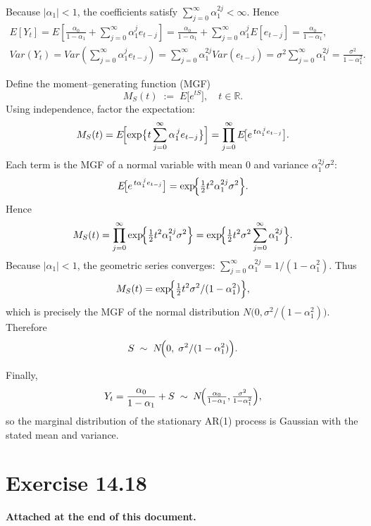 \documentclass{article}
\begin{document}
    Because \(|\alpha_1|<1\), the coefficients satisfy \(\sum_{j=0}^\infty \alpha_1^{2j}<\infty\). Hence
    \begin{align*}
        E[Y_t]
        =E\left[\frac{\alpha_0}{1-\alpha_1} + \sum_{j=0}^\infty \alpha_1^j e_{t-j}\right]
        =\frac{\alpha_0}{1-\alpha_1} + \sum_{j=0}^\infty \alpha_1^j E[e_{t-j}]
        =\frac{\alpha_0}{1-\alpha_1},\\
        Var(Y_t) = Var\left(\sum_{j=0}^\infty \alpha_1^j e_{t-j}\right)=\sum_{j=0}^\infty \alpha_1^{2j} Var(e_{t-j})=\sigma^2 \sum_{j=0}^\infty \alpha_1^{2j}=\frac{\sigma^2}{1-\alpha_1^2}.
    \end{align*}

    Define the moment--generating function (MGF)
    \[
        M_S(t) \;:=\; E\!\bigl[e^{tS}\bigr],
        \quad t\in \mathbb{R}.
    \]
    Using independence, factor the expectation:
    \[
    \begin{aligned}
        M_S(t)
        = E\!\Bigl[\exp\bigl\{t\sum_{j=0}^{\infty}\alpha_1^{\,j}e_{t-j}\bigr\}\Bigr]
        = \prod_{j=0}^{\infty} E\!\bigl[e^{\,t\alpha_1^{\,j}e_{t-j}}\bigr].
    \end{aligned}
    \]
    Each term is the MGF of a normal variable with mean \(0\) and variance
    \(\alpha_1^{2j}\sigma^{2}\):
    \[
        E\!\bigl[e^{\,t\alpha_1^{\,j}e_{t-j}}\bigr]
        = \exp\!\Bigl\{\tfrac12 t^{2}\alpha_1^{2j}\sigma^{2}\Bigr\}.
    \]
    Hence
    \[
        M_S(t)
        = \prod_{j=0}^{\infty}
          \exp\!\Bigl\{\tfrac12 t^{2}\alpha_1^{2j}\sigma^{2}\Bigr\}
        = \exp\!\Bigl\{\tfrac12 t^{2}\sigma^{2}
            \sum_{j=0}^{\infty}\alpha_1^{2j}\Bigr\}.
    \]
    Because \(|\alpha_1|<1\), the geometric series converges:
    \(
        \sum_{j=0}^{\infty}\alpha_1^{2j} = 1/(1-\alpha_1^{2}).
    \)
    Thus
    \[
        M_S(t)
        = \exp\!\Bigl\{\tfrac12 t^{2}\sigma^{2}/(1-\alpha_1^{2})\Bigr\},
    \]
    which is precisely the MGF of the normal distribution
    \(N\!\bigl(0,\sigma^{2}/(1-\alpha_1^{2})\bigr)\).
    Therefore
    \[
        S \;\sim\; N\!\Bigl(0,\;\sigma^{2}/(1-\alpha_1^{2})\Bigr).
    \]
    
    Finally,
    \[
        Y_t
        = \frac{\alpha_0}{1-\alpha_1} + S
        \;\sim\;
        N\!\Bigl(
            \tfrac{\alpha_0}{1-\alpha_1},
            \tfrac{\sigma^{2}}{1-\alpha_1^{2}}
          \Bigr),
    \]
    so the marginal distribution of the stationary AR(1) process is Gaussian
    with the stated mean and variance.

\section{Exercise 14.18}
\textbf{Attached at the end of this document.}
\end{document}
